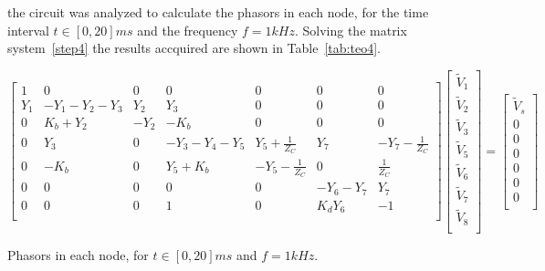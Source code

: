 \noindent the circuit was analyzed to calculate the phasors in each node, for the time interval $t\in [0,20]ms$ and the frequency $f=1kHz$.
Solving the matrix system~\ref{step4} the results accquired are shown in Table~\ref{tab:teo4}.

\begin{equation}\label{step4}
  \begin{bmatrix}
    1 & 0 & 0 & 0 & 0 & 0 & 0 \\
    Y_1 & -Y_1-Y_2-Y_3 & Y_2 & Y_3 & 0 & 0 & 0 \\
    0 & K_b+Y_2 & -Y_2 & -K_b & 0 & 0 & 0 \\
    0 & Y_3 & 0 & -Y_3-Y_4-Y_5 & Y_5+\frac{1}{Z_C} & Y_7 & -Y_7-\frac{1}{Z_C} \\
    0 & -K_b & 0 & Y_5+K_b & -Y_5-\frac{1}{Z_C} & 0 & \frac{1}{Z_C} \\
    0 & 0 & 0 & 0 & 0 & -Y_6-Y_7 & Y_7\\
    0 & 0 & 0 & 1 & 0 & K_dY_6 & -1\\
  \end{bmatrix}
  \begin{bmatrix}
    \tilde{V}_1\\
    \tilde{V}_2\\
    \tilde{V}_3\\
    \tilde{V}_5\\
    \tilde{V}_6\\
    \tilde{V}_7\\
    \tilde{V}_8\\
  \end{bmatrix}
  =
  \begin{bmatrix}
    \tilde{V}_{s}\\
    0\\
    0\\
    0\\
    0\\
    0\\
    0\\
  \end{bmatrix}
\end{equation}

\begin{table}[ht!]
  \centering
    
  \caption{Phasors in each node, for $t\in [0,20]ms$ and $f=1kHz$.}
  \label{tab:teo4}
\end{table}
\FloatBarrier





\vspace{-12pt}
